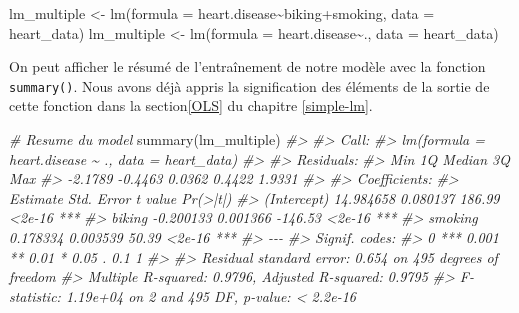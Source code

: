 \documentclass[
]{book}
\newenvironment{Shaded}{\begin{snugshade}}{\end{snugshade}}
\newcommand{\AttributeTok}[1]{\textcolor[rgb]{0.77,0.63,0.00}{#1}}
\newcommand{\CommentTok}[1]{\textcolor[rgb]{0.56,0.35,0.01}{\textit{#1}}}
\newcommand{\FunctionTok}[1]{\textcolor[rgb]{0.00,0.00,0.00}{#1}}
\newcommand{\NormalTok}[1]{#1}
\newcommand{\OtherTok}[1]{\textcolor[rgb]{0.56,0.35,0.01}{#1}}
\newcommand{\SpecialCharTok}[1]{\textcolor[rgb]{0.00,0.00,0.00}{#1}}
\begin{document}
\begin{Shaded}
\begin{Highlighting}[]
\NormalTok{lm\_multiple }\OtherTok{\textless{}{-}} \FunctionTok{lm}\NormalTok{(}\AttributeTok{formula =}\NormalTok{ heart.disease}\SpecialCharTok{\textasciitilde{}}\NormalTok{biking}\SpecialCharTok{+}\NormalTok{smoking, }\AttributeTok{data =}\NormalTok{ heart\_data)}
\NormalTok{lm\_multiple }\OtherTok{\textless{}{-}} \FunctionTok{lm}\NormalTok{(}\AttributeTok{formula =}\NormalTok{ heart.disease}\SpecialCharTok{\textasciitilde{}}\NormalTok{., }\AttributeTok{data =}\NormalTok{ heart\_data)}
\end{Highlighting}
\end{Shaded}

On peut afficher le résumé de l'entraînement de notre modèle avec la fonction \texttt{summary()}. Nous avons déjà appris la signification des éléments de la sortie de cette fonction dans la section\ref{OLS} du chapitre \ref{simple-lm}.

\begin{Shaded}
\begin{Highlighting}[]
\CommentTok{\# Resume du model}
\FunctionTok{summary}\NormalTok{(lm\_multiple)}
\CommentTok{\#\textgreater{} }
\CommentTok{\#\textgreater{} Call:}
\CommentTok{\#\textgreater{} lm(formula = heart.disease \textasciitilde{} ., data = heart\_data)}
\CommentTok{\#\textgreater{} }
\CommentTok{\#\textgreater{} Residuals:}
\CommentTok{\#\textgreater{}     Min      1Q  Median      3Q     Max }
\CommentTok{\#\textgreater{} {-}2.1789 {-}0.4463  0.0362  0.4422  1.9331 }
\CommentTok{\#\textgreater{} }
\CommentTok{\#\textgreater{} Coefficients:}
\CommentTok{\#\textgreater{}              Estimate Std. Error t value Pr(\textgreater{}|t|)    }
\CommentTok{\#\textgreater{} (Intercept) 14.984658   0.080137  186.99   \textless{}2e{-}16 ***}
\CommentTok{\#\textgreater{} biking      {-}0.200133   0.001366 {-}146.53   \textless{}2e{-}16 ***}
\CommentTok{\#\textgreater{} smoking      0.178334   0.003539   50.39   \textless{}2e{-}16 ***}
\CommentTok{\#\textgreater{} {-}{-}{-}}
\CommentTok{\#\textgreater{} Signif. codes:  }
\CommentTok{\#\textgreater{} 0 \textquotesingle{}***\textquotesingle{} 0.001 \textquotesingle{}**\textquotesingle{} 0.01 \textquotesingle{}*\textquotesingle{} 0.05 \textquotesingle{}.\textquotesingle{} 0.1 \textquotesingle{} \textquotesingle{} 1}
\CommentTok{\#\textgreater{} }
\CommentTok{\#\textgreater{} Residual standard error: 0.654 on 495 degrees of freedom}
\CommentTok{\#\textgreater{} Multiple R{-}squared:  0.9796, Adjusted R{-}squared:  0.9795 }
\CommentTok{\#\textgreater{} F{-}statistic: 1.19e+04 on 2 and 495 DF,  p{-}value: \textless{} 2.2e{-}16}
\end{Highlighting}
\end{Shaded}
\end{document}
